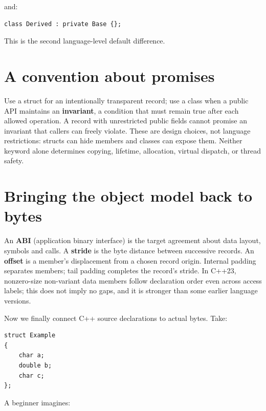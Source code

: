 and:

\begin{verbatim}
class Derived : private Base {};
\end{verbatim}

This is the second language-level default difference.

\section{A convention about promises}\label{05-engine-i-ch003-a-convention-about-promises}

\hypertarget{05-engine-i-ch003-a-convention-about-promises}{}

Use a struct for an intentionally transparent record; use a class when a public API maintains an \textbf{invariant}, a condition that must remain true after each allowed operation. A record with unrestricted public fields cannot promise an invariant that callers can freely violate. These are design choices, not language restrictions: structs can hide members and classes can expose them. Neither keyword alone determines copying, lifetime, allocation, virtual dispatch, or thread safety.

\section{Bringing the object model back to bytes}\label{05-engine-i-ch003-bringing-the-object-model-back-to-bytes}

\hypertarget{05-engine-i-ch003-bringing-the-object-model-back-to-bytes}{}

An \textbf{ABI} (application binary interface) is the target agreement about data layout, symbols and calls. A \textbf{stride} is the byte distance between successive records. An \textbf{offset} is a member's displacement from a chosen record origin. Internal padding separates members; tail padding completes the record's stride. In C++23, nonzero-size non-variant data members follow declaration order even across access labels; this does not imply no gaps, and it is stronger than some earlier language versions.

Now we finally connect C++ source declarations to actual bytes. Take:

\begin{verbatim}
struct Example
{
    char a;
    double b;
    char c;
};
\end{verbatim}

A beginner imagines:


